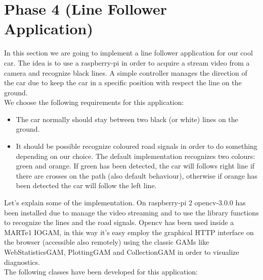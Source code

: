 \section{Phase 4 (Line Follower Application)}
In this section we are going to implement a line follower application for our cool car. The idea is to use a raspberry-pi in order to acquire a stream video from a camera and recognize black lines. A simple controller manages the direction of the car due to keep the car in a specific position with respect the line on the ground. \\
We choose the following requirements for this application:
\begin{itemize}
\item The car normally should stay between two black (or white) lines on the ground.
\item It should be possible recognize coloured road signals in order to do something depending on our choice. The default implementation recognizes two colours: green and orange. If green has been detected, the car will follows right line if there are crosses on the path (also default behaviour), otherwise if orange has been detected the car will follow the left line.
\end{itemize}
Let's explain some of the implementation. On raspberry-pi 2 opencv-3.0.0 has been installed due to manage the video streaming and to use the library functions to recognize the lines and the road signals. Opencv has been used inside a MARTe1 IOGAM, in this way it's easy employ the graphical HTTP interface on the browser (accessible also remotely) using the classic GAMs like WebStatisticsGAM, PlottingGAM and CollectionGAM in order to visualize diagnostics.\\
The following classes have been developed for this application:
